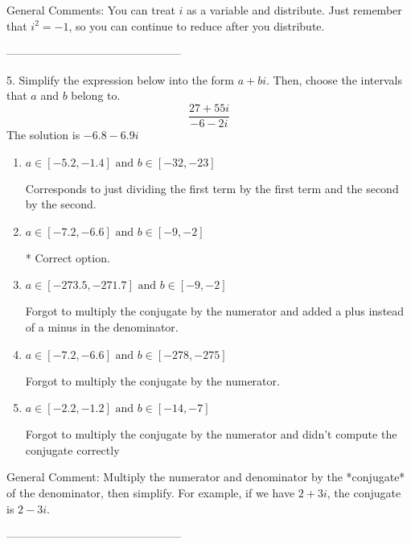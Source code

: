 \documentclass{article}[10pt]
\begin{document}
General Comments: You can treat $i$ as a variable and distribute. Just remember that $i^2=-1$, so you can continue to reduce after you distribute.

-----------------------------------------------

5. Simplify the expression below into the form $a+bi$. Then, choose the intervals that $a$ and $b$ belong to.
$$ \frac{27+55i}{-6-2i} $$ 
The solution is $ -6.8 - 6.9 i $ 

\begin{enumerate}[label=\Alph*.] 
\item $ a \in [-5.2, -1.4] \text{ and } b \in [-32, -23] $ 

  Corresponds to just dividing the first term by the first term and the second by the second. 
\item $ a \in [-7.2, -6.6] \text{ and } b \in [-9, -2] $ 

 * Correct option. 
\item $ a \in [-273.5, -271.7] \text{ and } b \in [-9, -2] $ 

  Forgot to multiply the conjugate by the numerator and added a plus instead of a minus in the denominator. 
\item $ a \in [-7.2, -6.6] \text{ and } b \in [-278, -275] $ 

  Forgot to multiply the conjugate by the numerator. 
\item $ a \in [-2.2, -1.2] \text{ and } b \in [-14, -7] $ 

  Forgot to multiply the conjugate by the numerator and didn't compute the conjugate correctly 
\end{enumerate} 
 
General Comment: Multiply the numerator and denominator by the *conjugate* of the denominator, then simplify. For example, if we have $2+3i$, the conjugate is $2-3i$.

-----------------------------------------------
\end{document}
